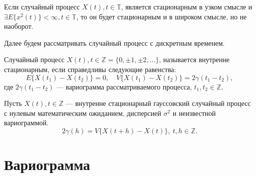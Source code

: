 \begin{Remark}
	Если случайный процесс $ X(t), t \in \mathbb{T} $, является стационарным в узком смысле и $ \exists E \{ x^2(t) \} < \infty, t \in \mathbb{T} $, то он будет стационарным и в широком смысле, но не наоборот.
\end{Remark}

Далее будем рассматривать случайный процесс с дискретным временем.

Случайный процесс $ X(t), t \in \mathbb{Z} = \{0, \pm 1, \pm 2, \dots \} $, называется внутренне стационарным, если справедливы следующие равенства:
\begin{equation*}
	E \{ X(t_1) - X(t_2) \} = 0, \quad V \{ X(t_1) - X(t_2) \} = 2 \gamma(t_1 - t_2),
\end{equation*}
где $ 2 \gamma(t_1 - t_2) $ --- вариограмма рассматриваемого процесса, $ t_1, t_2 \in \mathbb{Z} $.

Пусть $ X(t), t \in \mathbb{Z} $ --- внутренне стационарный гауссовский случайный процесс с нулевым математическим ожиданием, дисперсией $ \sigma^2 $ и неизвестной вариограммой.
\begin{equation*}
	2 \gamma(h) = V \{ X(t + h) - X(t) \}, ~ t,h \in \mathbb{Z}.
\end{equation*}


\section{Вариограмма} %
\label{sec:variogram}

